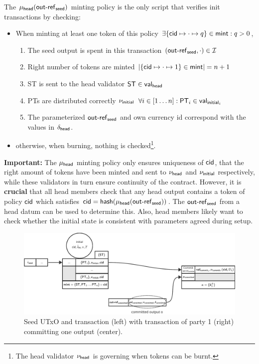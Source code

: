 \noindent The $\mu_\mathsf{head}(\mathsf{out\textsf{-}{}ref}_{\mathsf{seed}})$ minting policy is the only
script that verifies init transactions by checking:
\begin{itemize}
  \item When minting at least one token of this policy
  $\exists \{\mathsf{cid} \mapsto \cdot \mapsto q\} \in \mathsf{mint} : q > 0$,
  \begin{enumerate}
    \item The seed output is spent in this transaction
          $(\mathsf{out\textsf{-}{}ref}_{\mathsf{seed}}, \cdot) \in \mathcal{I}$
    \item Right number of tokens are minted
          $|\{\mathsf{cid} \mapsto \cdot \mapsto 1\} \in \mathsf{mint}| = n + 1$
    \item ST is sent to the head validator $\mathsf{ST} \in \mathsf{val}_{\mathsf{head}}$
    \item PTs are distributed correctly $\nu_{\mathsf{initial}}$
          $\forall i \in [1 \dots n] : \mathsf{PT}_{i} \in \mathsf{val}_{\mathsf{initial}_{i}}$
    \item The parameterized $\mathsf{out\textsf{-}{}ref}_{\mathsf{seed}}$ and own currency id
          correspond with the values in $\delta_{\mathsf{head}}$.
    \end{enumerate}
  \item otherwise, when burning, nothing is checked\footnote{The head validator
        $\nu_\mathsf{head}$ is governing when tokens can be burnt.}.
\end{itemize}

\noindent \textbf{Important:} The $\mu_\mathsf{head}$ minting policy only ensures
uniqueness of $\mathsf{cid}$, that the right amount of tokens have been minted and sent
to $\nu_\mathsf{head}$ and $\nu_{\mathsf{initial}}$ respectively, while these validators in turn
ensure continuity of the contract. However, it is \textbf{crucial} that all head
members check that any head output contains a token of policy $\mathsf{cid}$ which
satisfies $\mathsf{cid} = \mathsf{hash}(\mu_\mathsf{head}(\mathsf{out\textsf{-}{}ref}_{\mathsf{seed}}))$. The
$\mathsf{out\textsf{-}{}ref}_{\mathsf{seed}}$ from a head datum can be used to determine this.
Also, head members likely want to check
whether the initial state is consistent with parameters agreed during setup. \\

\begin{figure}[h]
  \centering
  \includegraphics[width=\textwidth]{figures/SM-init-commit.pdf}
  \caption{Seed UTxO and \mtxInit{} transaction (left) with \mtxCom{}
    transaction of party 1 (right) committing one output
    (center).}\label{fig:SM-init-commit}
\end{figure}

